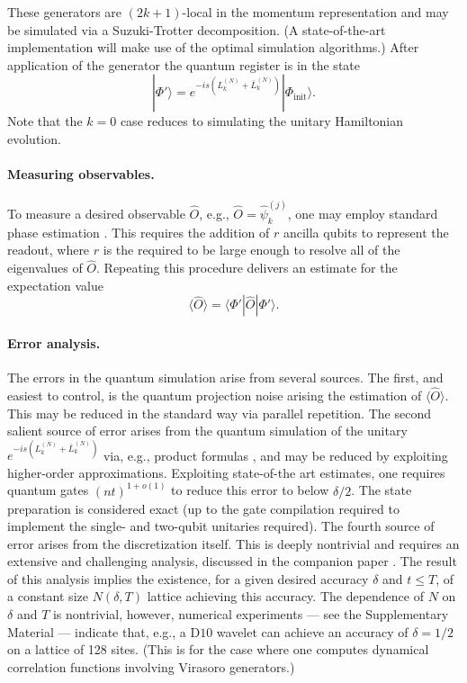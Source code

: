 \documentclass[12pt]{article}
\newcommand{\1}{\mathds{1}}
\begin{document}
These generators are $(2k+1)$-local in the momentum representation and may be simulated via a Suzuki-Trotter decomposition. (A state-of-the-art implementation will make use of the optimal simulation algorithms.)
After application of the generator the quantum register is in the state
\begin{equation}
	|\Phi'\rangle = e^{-i s (L_k^{(N)}+\overline{L}_k^{(N)})}|\Phi_{\text{init}}\rangle.
\end{equation}
Note that the $k=0$ case reduces to simulating the unitary Hamiltonian evolution.

\paragraph*{Measuring observables.} To measure a desired observable $\widehat{O}$, e.g., $\widehat{O} = \widehat{\psi}_k^{(j)}$, one may employ standard phase estimation \cite{nielsenQuantumComputationQuantum2000,childsQuantumSearchMeasurement2002}. This requires the addition of $r$ ancilla qubits to represent the readout, where $r$ is the required to be large enough to resolve all of the eigenvalues of $\widehat{O}$. Repeating this procedure delivers an estimate for the expectation value
\begin{equation}
	\langle\widehat{O} \rangle = \langle\Phi'|\widehat{O}|\Phi'\rangle.
\end{equation}

\paragraph*{Error analysis.} The errors in the quantum simulation arise from several sources. The first, and easiest to control, is the quantum projection noise arising the estimation of $\langle \widehat{O}\rangle$. This may be reduced in the standard way via parallel repetition. The second salient source of error arises from the quantum simulation of the unitary $e^{-i s (L_k^{(N)}+\overline{L}_k^{(N)})}$ via, e.g., product formulas \cite{childsNearlyOptimalLattice2019}, and may be reduced by exploiting higher-order approximations. Exploiting state-of-the art estimates, one requires quantum gates $(nt)^{1+o(1)}$ to reduce this error to below $\delta/2$. The state preparation is considered exact (up to the gate compilation required to implement the single- and two-qubit unitaries required). The fourth source of error arises from the discretization itself. This is deeply nontrivial and requires an extensive and challenging analysis, discussed in the companion paper \cite{osborneConformal2021}. The result of this analysis implies the existence, for a given desired accuracy $\delta$ and $t\leq T$, of a constant size $N(\delta,T)$ lattice achieving this accuracy. The dependence of $N$ on $\delta$ and $T$ is nontrivial, however, numerical experiments --- see the Supplementary Material --- indicate that, e.g., a D$10$ wavelet can achieve an accuracy of $\delta = 1/2$ on a lattice of 128 sites. (This is for the case where one computes dynamical correlation functions involving Virasoro generators.)
\end{document}
